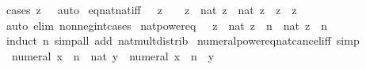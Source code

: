 \begin{isabellebody}
\ {\isacharparenleft}{\kern0pt}cases\ {\isachardoublequoteopen}z\ {\isasymge}\ {}{\isachardoublequoteclose}{\isacharparenright}{\kern0pt}\ auto%
\endisatagproof
{\isafoldproof}%
%
\isadelimproof
\isanewline
%
\endisadelimproof
\isanewline
{}\isamarkupfalse%
\ eq{\isacharunderscore}{\kern0pt}nat{\isacharunderscore}{\kern0pt}nat{\isacharunderscore}{\kern0pt}iff{\isacharcolon}{\kern0pt}\ {\isachardoublequoteopen}{}\ {\isasymle}\ z\ {\isasymLongrightarrow}\ {}\ {\isasymle}\ z{\isacharprime}{\kern0pt}\ {\isasymLongrightarrow}\ nat\ z\ {\isacharequal}{\kern0pt}\ nat\ z{\isacharprime}{\kern0pt}\ {\isasymlongleftrightarrow}\ z\ {\isacharequal}{\kern0pt}\ z{\isacharprime}{\kern0pt}{\isachardoublequoteclose}\isanewline
%
\isadelimproof
\ \ %
\endisadelimproof
%
\isatagproof
{}\isamarkupfalse%
\ {\isacharparenleft}{\kern0pt}auto\ elim{\isacharcolon}{\kern0pt}\ nonneg{\isacharunderscore}{\kern0pt}int{\isacharunderscore}{\kern0pt}cases{\isacharparenright}{\kern0pt}%
\endisatagproof
{\isafoldproof}%
%
\isadelimproof
\isanewline
%
\endisadelimproof
\isanewline
{}\isamarkupfalse%
\ nat{\isacharunderscore}{\kern0pt}power{\isacharunderscore}{\kern0pt}eq{\isacharcolon}{\kern0pt}\ {\isachardoublequoteopen}{}\ {\isasymle}\ z\ {\isasymLongrightarrow}\ nat\ {\isacharparenleft}{\kern0pt}z\ {\isacharcircum}{\kern0pt}\ n{\isacharparenright}{\kern0pt}\ {\isacharequal}{\kern0pt}\ nat\ z\ {\isacharcircum}{\kern0pt}\ n{\isachardoublequoteclose}\isanewline
%
\isadelimproof
\ \ %
\endisadelimproof
%
\isatagproof
{}\isamarkupfalse%
\ {\isacharparenleft}{\kern0pt}induct\ n{\isacharparenright}{\kern0pt}\ {\isacharparenleft}{\kern0pt}simp{\isacharunderscore}{\kern0pt}all\ add{\isacharcolon}{\kern0pt}\ nat{\isacharunderscore}{\kern0pt}mult{\isacharunderscore}{\kern0pt}distrib{\isacharparenright}{\kern0pt}%
\endisatagproof
{\isafoldproof}%
%
\isadelimproof
\isanewline
%
\endisadelimproof
\isanewline
{}\isamarkupfalse%
\ numeral{\isacharunderscore}{\kern0pt}power{\isacharunderscore}{\kern0pt}eq{\isacharunderscore}{\kern0pt}nat{\isacharunderscore}{\kern0pt}cancel{\isacharunderscore}{\kern0pt}iff\ {\isacharbrackleft}{\kern0pt}simp{\isacharbrackright}{\kern0pt}{\isacharcolon}{\kern0pt}\isanewline
\ \ {\isachardoublequoteopen}numeral\ x\ {\isacharcircum}{\kern0pt}\ n\ {\isacharequal}{\kern0pt}\ nat\ y\ {\isasymlongleftrightarrow}\ numeral\ x\ {\isacharcircum}{\kern0pt}\ n\ {\isacharequal}{\kern0pt}\ y{\isachardoublequoteclose}\isanewline
%
\isadelimproof
\ \ %
\endisadelimproof

\end{isabellebody}
